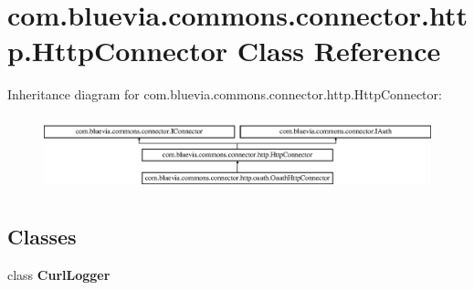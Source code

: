 \hypertarget{classcom_1_1bluevia_1_1commons_1_1connector_1_1http_1_1HttpConnector}{
\section{com.bluevia.commons.connector.http.HttpConnector Class Reference}
\label{classcom_1_1bluevia_1_1commons_1_1connector_1_1http_1_1HttpConnector}
}
Inheritance diagram for com.bluevia.commons.connector.http.HttpConnector:\begin{figure}[H]
\begin{center}
\leavevmode
\includegraphics[height=2.193212cm]{classcom_1_1bluevia_1_1commons_1_1connector_1_1http_1_1HttpConnector}
\end{center}
\end{figure}
\subsection*{Classes}
\begin{DoxyCompactItemize}
\item 
class {\bfseries CurlLogger}
\end{DoxyCompactItemize}
